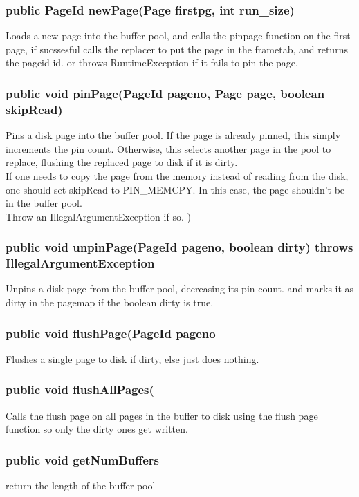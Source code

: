 \documentclass[a4paper,10pt,titlepage]{report}
\begin{document}
\subsubsection{public PageId newPage(Page firstpg, int run\_size)}
Loads a new page into the buffer pool, and calls the pinpage function on the first page, if sucssesful calls the replacer to put the page in the frametab, and returns the pageid id. or throws RuntimeException if it fails to pin the page.

\subsubsection{public void pinPage(PageId pageno, Page page, boolean skipRead)}
Pins a disk page into the buffer pool. If the page is already pinned,
this simply increments the pin count. Otherwise, this selects another
page in the pool to replace, flushing the replaced page to disk if
it is dirty.
\vspace{5mm}
\\
If one needs to copy the page from the memory instead of reading from
the disk, one should set skipRead to PIN\_MEMCPY. In this case, the page
shouldn't be in the buffer pool. \\ Throw an IllegalArgumentException if so. )

\subsubsection{  public void unpinPage(PageId pageno, boolean dirty) throws IllegalArgumentException }
Unpins a disk page from the buffer pool, decreasing its pin count. and marks it as dirty in the pagemap if the boolean dirty is true.
\vspace{5mm}

\subsubsection{public void flushPage(PageId pageno}
Flushes a single page to disk if dirty, else just does nothing.

\subsubsection{public void flushAllPages(}
Calls the flush page on all pages in the buffer to disk using the flush page function so only the dirty ones get written.

\subsubsection{public void getNumBuffers}
return the length of the buffer pool
\end{document}
